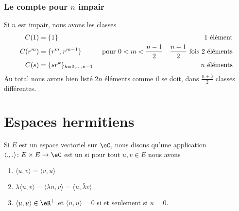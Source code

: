 \subsubsection{Le compte pour $ n$ impair}
\label{Subsubsec*GJIzDEP}

Si \( n\) est impair, nous avons les classes
\begin{subequations}
    \begin{align}
        C(1)&=\{ 1 \}       &&&\text{\( 1\) élément}\\
        C(r^m)&=\{ r^m,r^{m-1} \}&\text{ pour }&0<m<\frac{ n-1 }{2}   &\text{\( \frac{ n-1 }{2}\) fois \( 2\) éléments}\\
        C(s)&=\{ sr^k \}_{k=0,\ldots, n-1} &&& \text{\( n\) éléments}
    \end{align}
\end{subequations}
Au total nous avons bien listé \( 2n\) éléments comme il se doit, dans \(  \frac{ n+3 }{2}\) classes différentes.

\section{Espaces hermitiens}

\begin{definition}  \label{DefMZQxmQ}
Si \( E\) est un espace vectoriel sur \( \eC\), nous disons qu'une application \( \langle ., .\rangle \colon E\times E\to \eC\) est un  si pour tout \( u,v\in E\) nous avons
\begin{enumerate}
    \item
        \( \langle u, v\rangle =\overline{ \langle v, u\rangle  }\)
    \item
        \( \lambda\langle u, v\rangle =\langle \lambda u, v\rangle =\langle u, \bar \lambda v\rangle \)
    \item
        \( \langle u, u\rangle \in \eR^+\) et \( \langle u, u\rangle =0\) si et seulement si \( u=0\).
\end{enumerate}
\end{definition}
